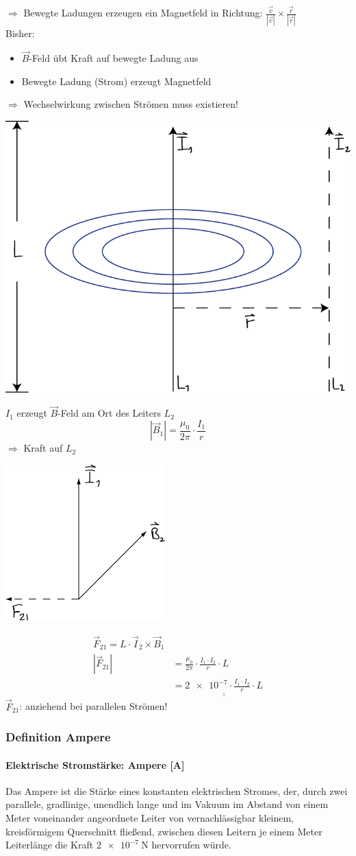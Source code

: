 $ \Rightarrow $ Bewegte Ladungen erzeugen ein Magnetfeld in Richtung: $ \frac{\vec{v}}{|\vec{v}|} \times \frac{\vec{r}}{|\vec{r}|}  $ \\
Bisher:
\begin{itemize}
	\item $ \vec{B} $-Feld übt Kraft auf bewegte Ladung aus
	\item Bewegte Ladung (Strom) erzeugt Magnetfeld
\end{itemize}
$ \Rightarrow $ Wechselwirkung zwischen Strömen muss existieren!

\begin{center}
\includegraphics[width=0.4\linewidth]{skizzen/16/16_2B03}
\end{center}


$ I_1 $ erzeugt $ \vec{B} $-Feld am Ort des Leiters $ L_2 $
$$ |\vec{B}_1| = \frac{\mu_0}{2\pi} \cdot \frac{I_1}{r} $$
$ \Rightarrow $ Kraft auf $ L_2 $
\begin{center}
\includegraphics[width=0.2\linewidth]{skizzen/16/16_2B04}
\end{center}

\begin{align*}
\vec{F}_{21} = L \cdot \vec{I}_2 \times \vec{B}_1\\
|\vec{F}_{21}| &= \frac{\mu_0}{2\pi} \cdot \frac{I_1 \cdot I_2}{r} \cdot L\\
&= \underline{\underline{\num{2e-7} \cdot \frac{I_1 \cdot I_2}{r} \cdot L}}
\end{align*}
$ \vec{F}_{21} $: anziehend bei parallelen Strömen! 
\subsubsection{Definition Ampere}
\paragraph{Elektrische Stromstärke: Ampere [A]}
Das Ampere ist die Stärke eines konstanten elektrischen Stromes, der, durch zwei parallele, gradlinige, unendlich lange und im Vakuum im Abstand von einem Meter voneinander angeordnete Leiter von vernachlässigbar kleinem, kreisförmigem Querschnitt fließend, zwischen diesen Leitern je einem Meter Leiterlänge die Kraft $ \SI{2e-7}{\newton} $ hervorrufen würde.\hfill \break

